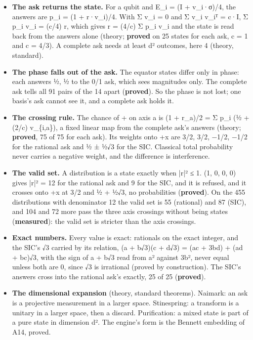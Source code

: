 \begin{itemize}
\item \textbf{The ask returns the state.} For a qubit and E\_\allowbreak{}i = (I + v\_\allowbreak{}i·σ)/4, the answers are p\_\allowbreak{}i = (1 + r·v\_\allowbreak{}i)/4. With Σ v\_\allowbreak{}i = 0 and Σ v\_\allowbreak{}i v\_\allowbreak{}iᵀ = c·I, Σ p\_\allowbreak{}i v\_\allowbreak{}i = (c/4) r, which gives r = (4/c) Σ p\_\allowbreak{}i v\_\allowbreak{}i and the state is read back from the answers alone (theory; \textbf{proved} on 25 states for each ask, c = 1 and c = 4/3). A complete ask needs at least d² outcomes, here 4 (theory, standard).
\item \textbf{The phase falls out of the ask.} The equator states differ only in phase: each answers ½, ½ to the 0/1 ask, which sees magnitudes only. The complete ask tells all 91 pairs of the 14 apart (\textbf{proved}). So the phase is not lost; one basis's ask cannot see it, and a complete ask holds it.
\item \textbf{The crossing rule.} The chance of + on axis a is (1 + r\_\allowbreak{}a)/2 = Σ p\_\allowbreak{}i (½ + (2/c) v\_\allowbreak{}\{i,a\}), a fixed linear map from the complete ask's answers (theory; \textbf{proved}, 75 of 75 for each ask). Its weights onto +x are 3/2, 3/2, −1/2, −1/2 for the rational ask and ½ ± ½√3 for the SIC. Classical total probability never carries a negative weight, and the difference is interference.
\item \textbf{The valid set.} A distribution is a state exactly when |r|² ≤ 1. (1, 0, 0, 0) gives |r|² = 12 for the rational ask and 9 for the SIC, and it is refused, and it crosses onto +x at 3/2 and ½ + ½√3, no probabilities (\textbf{proved}). On the 455 distributions with denominator 12 the valid set is 55 (rational) and 87 (SIC), and 104 and 72 more pass the three axis crossings without being states (\textbf{measured}): the valid set is stricter than the axis crossings.
\item \textbf{Exact numbers.} Every value is exact: rationals on the exact integer, and the SIC's √3 carried by its relation, (a + b√3)(c + d√3) = (ac + 3bd) + (ad + bc)√3, with the sign of a + b√3 read from a² against 3b², never equal unless both are 0, since √3 is irrational (proved by construction). The SIC's answers cross into the rational ask's exactly, 25 of 25 (\textbf{proved}).
\item \textbf{The dimensional expansion} (theory, standard theorems). Naimark: an ask is a projective measurement in a larger space. Stinespring: a transform is a unitary in a larger space, then a discard. Purification: a mixed state is part of a pure state in dimension d². The engine's form is the Bennett embedding of A14, proved.

\end{itemize}
